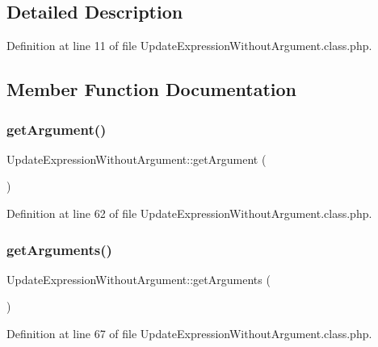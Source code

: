 \subsection{Detailed Description}


Definition at line 11 of file Update\+Expression\+Without\+Argument.\+class.\+php.



\subsection{Member Function Documentation}
\hypertarget{classUpdateExpressionWithoutArgument_a6b1b1611de45acf42d4a10f71343de38}{}\label{classUpdateExpressionWithoutArgument_a6b1b1611de45acf42d4a10f71343de38} 
\subsubsection{\texorpdfstring{get\+Argument()}{getArgument()}}
{\footnotesize\ttfamily Update\+Expression\+Without\+Argument\+::get\+Argument (\begin{DoxyParamCaption}{ }\end{DoxyParamCaption})}



Definition at line 62 of file Update\+Expression\+Without\+Argument.\+class.\+php.

\hypertarget{classUpdateExpressionWithoutArgument_ae196b9aa4c42acda72b3ec725b1b7bed}{}\label{classUpdateExpressionWithoutArgument_ae196b9aa4c42acda72b3ec725b1b7bed} 
\subsubsection{\texorpdfstring{get\+Arguments()}{getArguments()}}
{\footnotesize\ttfamily Update\+Expression\+Without\+Argument\+::get\+Arguments (\begin{DoxyParamCaption}{ }\end{DoxyParamCaption})}



Definition at line 67 of file Update\+Expression\+Without\+Argument.\+class.\+php.


